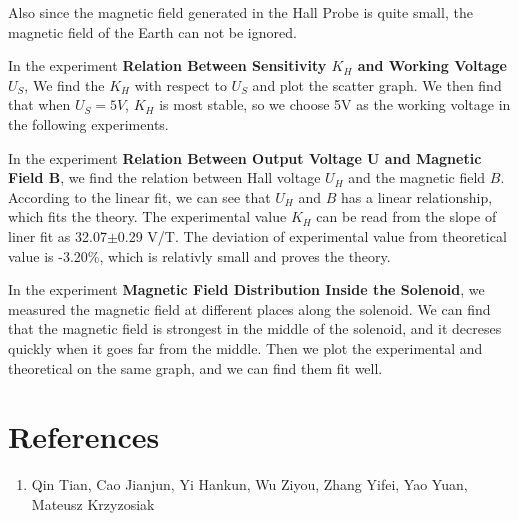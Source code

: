 \documentclass[12pt, a4paper]{article}
\begin{document}
Also since the magnetic field generated in the Hall Probe is quite small, the magnetic field of the Earth can not 
be ignored.

In the experiment \textbf{Relation Between Sensitivity $K_H$ and Working Voltage $U_S$}, We find the $K_H$ with 
respect to $U_S$ and plot the scatter graph. We then find that when $U_S = 5V$, $K_H$ is most stable, so we choose 
5V as the working voltage in the following experiments.

In the experiment \textbf{Relation Between Output Voltage U and Magnetic Field B}, we find the relation between Hall 
voltage $U_H$ and the magnetic field $B$. According to the linear fit, we can see that $U_H$ and $B$ has a linear relationship, 
which fits the theory. The experimental value $K_H$ can be read from the slope of liner fit as 32.07$\pm$0.29 V/T. The 
deviation of experimental value from theoretical value is -3.20\%, which is relativly small and proves the theory.

In the experiment \textbf{Magnetic Field Distribution Inside the Solenoid}, we measured the magnetic field at different places along 
the solenoid. We can find that the magnetic field is strongest in the middle of the solenoid, and it decreses quickly when it goes 
far from the middle. Then we plot the experimental and theoretical on the same graph, and we can find them fit well.




\section{References}
    \begin{enumerate}
        \item Qin Tian, Cao Jianjun, Yi Hankun, Wu Ziyou, Zhang Yifei, Yao Yuan, Mateusz Krzyzosiak
    \end{enumerate}
\end{document}
